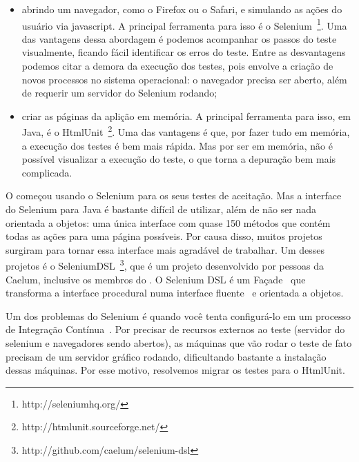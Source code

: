 \begin{itemize}
	\item{abrindo um navegador, como o Firefox ou o Safari, e simulando as ações do usuário via javascript. A principal	ferramenta para isso é o Selenium~\footnote{http://seleniumhq.org/}. Uma das vantagens dessa abordagem é podemos acompanhar os passos do teste visualmente, ficando fácil identificar os erros do teste. Entre as desvantagens podemos citar a demora da execução dos testes, pois envolve a criação de novos processos no sistema operacional: o navegador precisa ser aberto, além de requerir um servidor do Selenium rodando;}
	\item{criar as páginas da aplição em memória. A principal ferramenta para isso, em Java, é o HtmlUnit~\footnote{http://htmlunit.sourceforge.net/}. Uma das vantagens é que, por fazer tudo em memória, a execução dos testes é bem mais rápida. Mas por ser em memória, não é possível visualizar a execução do teste, o que torna a depuração bem mais complicada.}
\end{itemize}

O \calopsita começou usando o Selenium para os seus testes de aceitação. Mas a interface do Selenium para Java é bastante difícil de utilizar, além de não ser nada orientada a objetos: uma única interface com quase 150 métodos que contém todas as ações para uma página possíveis. Por causa disso, muitos projetos surgiram para tornar essa interface mais agradável de trabalhar. Um desses projetos é o SeleniumDSL~\footnote{http://github.com/caelum/selenium-dsl}, que é um projeto \opensource desenvolvido por pessoas da Caelum, inclusive os membros do \calopsita. O Selenium DSL é um Façade~\cite{gof} que transforma a interface procedural numa interface fluente~\cite{dsl} e orientada a objetos.

Um dos problemas do Selenium é quando você tenta configurá-lo em um processo de Integração Contínua~\cite{ci}. Por precisar de recursos externos ao teste (servidor do selenium e navegadores sendo abertos), as máquinas que vão rodar o teste de fato precisam de um servidor gráfico rodando, dificultando bastante a instalação dessas máquinas. Por esse motivo, resolvemos migrar os testes para o HtmlUnit.

